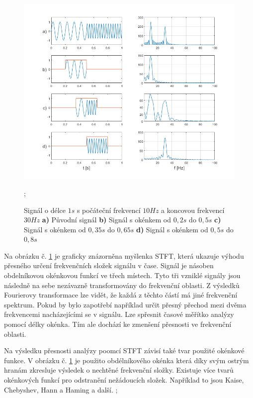   \begin{figure}[H]
    \centering
    \includegraphics[width = 1\linewidth]{obrazky/STFT.png}
    \caption{Signál o délce $1 s$ s počáteční frekvencí $10 Hz$ a koncovou frekvencí $30 Hz$ \textbf{a)} Původní signál \textbf{b)} Signál s okénkem od $0,2 s$ do $0,5 s$ \textbf{c)} Signál s okénkem od $0,35 s$ do $0,65 s$ \textbf{d)} Signál s okénkem od $0,5 s$ do $0,8 s$};
    \label{fig:STFT}
  \end{figure}

  Na obrázku č. \ref*{fig:STFT} je graficky znázorněna myšlenka \acs{STFT}, která ukazuje výhodu přesného určení frekvenčních složek signálu v čase. 
  Signál je násoben obdelníkovou okénkovou funkcí ve třech místech.
  Tyto tři vzniklé signály jsou následně na sebe nezávazně transformovány do frekvenční oblasti.
  Z výsledků Fourierovy transformace lze vidět, že každá z těchto částí má jiné frekvenční spektrum.
  Pokud by bylo zapotřebí například určit přesný přechod mezi dvěma frekvencemi nacházejícími se v signálu. Lze spřesnit časové měřítko analýzy pomocí délky okénka.
  Tím ale dochází ke zmenšení přesnosti ve frekvenční oblasti.
  
  Na výsledku přesnosti analýzy poomcí \acs{STFT} závisí také tvar použité okénkové funkce.
  V obrázku č. \ref*{fig:STFT} je použito obdélníkového okénka která díky svým ostrým hranám zkresluje výsledek o nechtěné frekvenční složky.
  Existuje více tvarů okénkových funkcí pro odstranění nežádoucích složek.
  Například to jsou Kaise, Chebyshev, Hann a Haming a další.
  \cite{Time-frequency_distributions};

